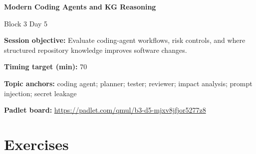 \documentclass[11pt]{article}
\begin{document}
\begin{center}\LARGE\bfseries Modern Coding Agents and KG Reasoning\end{center}

\begin{center}\large Block 3 Day 5\end{center}

\begin{tcolorbox}[colback=MidnightBlue!4,colframe=MidnightBlue,title={Session Overview},fonttitle=\bfseries,breakable]
\textbf{Session objective:} Evaluate coding-agent workflows, risk controls, and where structured repository knowledge improves software changes.

\textbf{Timing target (min):} 70

\textbf{Topic anchors:} coding agent; planner; tester; reviewer; impact analysis; prompt injection; secret leakage

\textbf{Padlet board:} \url{https://padlet.com/qmul/b3-d5-mjxv8jfjor5277z8}
\end{tcolorbox}

\section*{Exercises}
\end{document}
